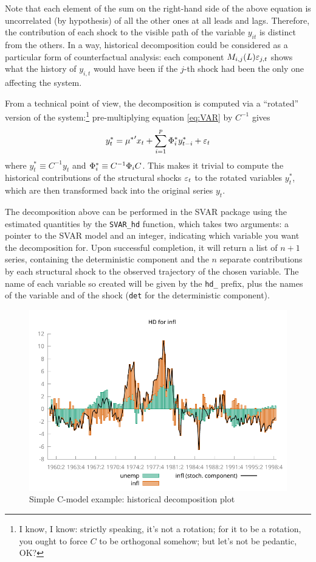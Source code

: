 \documentclass[a4paper,10pt]{article}
\newcommand{\cmd}[1]{\texttt{#1}}
\newcommand{\StS}[1]{\ensuremath \varepsilon_{#1}} %
\newcommand{\VarSym}{\ensuremath \Phi}
\begin{document}
Note that each element of the sum on the right-hand side of the above
equation is uncorrelated (by hypothesis) of all the other ones at all
leads and lags. Therefore, the contribution of each shock to the
visible path of the variable $y_{it}$ is distinct from the others. In
a way, historical decomposition could be considered as a particular
form of counterfactual analysis: each component $M_{i,j}(L) \StS{j,t}$
shows what the history of $y_{i,t}$ would have been if the $j$-th
shock had been the only one affecting the system.

From a technical point of view, the decomposition is computed via a
``rotated'' version of the system:\footnote{I know, I know: strictly
  speaking, it's not a rotation; for it to be a rotation, you ought to
  force $C$ to be orthogonal somehow; but let's not be pedantic, OK?}
pre-multiplying equation \eqref{eq:VAR} by $C^{-1}$ gives
\[
  y^*_t = {\mu^*}' x_t +  \sum_{i=1}^p \VarSym^*_i y^*_{t-i} + \StS{t}
\]
where $y^*_t \equiv C^{-1} y_t$ and $\VarSym^*_i \equiv C^{-1}
\VarSym_i C$. This makes it trivial to compute the historical
contributions of the structural shocks $\StS{t}$ to the rotated
variables $y^*_t$, which are then transformed back into the original
series $y_t$.

The decomposition above can be performed in the SVAR package using the
estimated quantities by the \cmd{SVAR\_hd} function, which takes two
arguments: a pointer to the SVAR model and an integer, indicating
which variable you want the decomposition for. Upon successful
completion, it will return a list of $n+1$ series, containing the
deterministic component and the $n$ separate contributions by each
structural shock to the observed trajectory of the chosen
variable. The name of each variable so created will be given by the
\verb|hd_| prefix, plus the names of the variable and of the shock
(\verb|det| for the deterministic component).

\begin{figure}[htbp]
  \centering
  \includegraphics[scale=0.8]{Cmodel_hd}
  \caption{Simple C-model example: historical decomposition plot}
  \label{fig:Cmodel-hd}
\end{figure}
\end{document}

